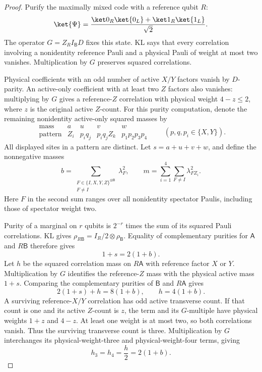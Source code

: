 \begin{proof}
Purify the maximally mixed code with a reference qubit \(R\):
\[
 \ket{\Psi}=
 \frac{\ket0_R\ket{0_L}+\ket1_R\ket{1_L}}{\sqrt2}.
\]
The operator \(G=Z_RI_{\mathsf B}D\) fixes this state. KL says that every
correlation involving a nonidentity reference Pauli and a physical
Pauli of weight at most two vanishes. Multiplication by \(G\) preserves
squared correlations.

Physical coefficients with an odd number of active \(X/Y\) factors
vanish by \(D\)-parity. An active-only coefficient with at least two
\(Z\) factors also vanishes: multiplying by \(G\) gives a
reference-\(Z\) correlation with physical weight \(4-z\le2\), where
\(z\) is the original active \(Z\)-count.
For this purity computation, denote the remaining nonidentity
active-only squared masses by
\[
 \begin{array}{c|cccc}
 \text{mass}&a&u&v&w\\ \hline
 \text{pattern}&Z_i&p_iq_j&p_iq_jZ_k&p_1p_2p_3p_4
 \end{array}
 \qquad(p,q,p_i\in\{X,Y\}).
\]
All displayed sites in a pattern are distinct. Let \(s=a+u+v+w\), and
define the nonnegative masses
\[
 b=\sum_{\substack{F\in\{I,X,Y,Z\}^{\otimes\mathsf B}\\F\ne I}}
       \lambda_F^2,\qquad
 m=\sum_{i=1}^4\sum_{F\ne I}\lambda_{FZ_i}^2.
\]
Here \(F\) in the second sum ranges over all nonidentity spectator
Paulis, including those of spectator weight two.

Purity of a marginal on \(r\) qubits is \(2^{-r}\) times the sum of its
squared Pauli correlations. KL gives
\(\rho_{R\mathsf B}=I_R/2\otimes\rho_{\mathsf B}\).
Equality of complementary purities for \(\mathsf A\) and \(R\mathsf B\)
therefore gives
\begin{equation}
 1+s=2(1+b).
 \label{o2gc:purity-1}
\end{equation}
Let \(h\) be the squared correlation mass on \(R\mathsf A\) with
reference factor \(X\) or \(Y\). Multiplication by \(G\) identifies the
reference-\(Z\) mass with the physical active mass \(1+s\). Comparing
the complementary purities of \(\mathsf B\) and \(R\mathsf A\) gives
\[
 2(1+s)+h=8(1+b),\qquad h=4(1+b).
\]
A surviving reference-\(X/Y\) correlation has odd active transverse
count. If that count is one and its active \(Z\)-count is \(z\), the
term and its \(G\)-multiple have physical weights \(1+z\) and \(4-z\).
At least one weight is at most two, so both correlations vanish.
Thus the surviving transverse count is three. Multiplication by \(G\)
interchanges its physical-weight-three and physical-weight-four
terms, giving
\begin{equation}
 h_3=h_4=\frac h2=2(1+b).
 \label{o2gc:purity-h}
\end{equation}


\end{proof}
